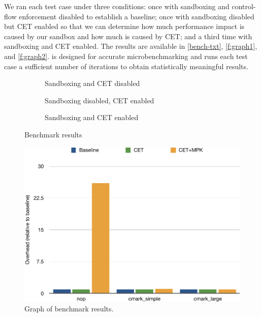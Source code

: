 We ran each test case under three conditions: once with sandboxing and control-flow enforcement
disabled to establish a baseline; once with sandboxing disabled but CET enabled so that we can
determine how much performance impact is caused by our sandbox and how much is caused by CET; and a
third time with sandboxing and CET enabled. The results are available in \autoref{bench-txt},
\autoref{f:graph1}, and \autoref{f:graph2}.  is designed for accurate
microbenchmarking and runs each test case a sufficient number of iterations to obtain statistically
meaningful results.

\begin{figure}[ht]

\begin{subfigure}{1\textwidth}

\coderule
\caption{Sandboxing and CET disabled}
\end{subfigure}

\begin{subfigure}{1\textwidth}

\coderule
\caption{Sandboxing disabled, CET enabled}
\end{subfigure}

\begin{subfigure}{1\textwidth}

\coderule
\caption{Sandboxing and CET enabled}
\end{subfigure}

\caption{Benchmark results}
\label{bench-txt}
\end{figure}

\begin{figure}[ht]
    \includegraphics[width=\textwidth]{fig/graph1}
    \caption{Graph of benchmark results.}
    \label{f:graph1}
\end{figure}

